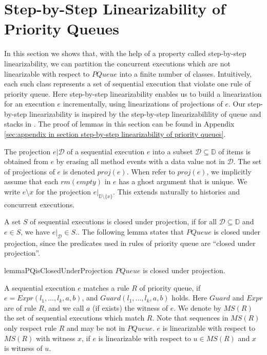\section{Step-by-Step Linearizability of Priority Queues}
\label{sec:step-by-step linearizability of priority queues}

In this section we shows that, with the help of a property called step-by-step linearizability, we can partition the concurrent executions which are not linearizable with respect to $\textit{PQueue}$ into a finite number of classes. Intuitively, each such class represents a set of sequential execution that violate one rule of priority queue. Here step-by-step linearizability enables us to build a linearization for an execution $e$ incrementally, using linearizations of projections of $e$. Our step-by-step linearizability is inspired by the step-by-step linearizabilility of queue and stacks in \cite{Bouajjani:2015}. The proof of lemmas in this section can be found in Appendix \ref{sec:appendix in section step-by-step linearizability of priority queues}.

The projection $e \vert{\mathcal{D}}$ of a sequential execution $e$ into a subset $\mathcal{D} \subseteq \mathbb{D}$ of items is obtained from $e$ by erasing all method events with a data value not in $\mathcal{D}$. The set of projections of $e$ is denoted $\textit{proj}(e)$. When refer to $\textit{proj}(e)$, we implicitly assume that each $\textit{rm}(\textit{empty})$ in $e$ has a ghost argument that is unique. We write $e \setminus x$ for the projection $e \vert_{ \mathbb{D} \setminus \{ x \} }$. This extends naturally to histories and concurrent executions.

A set $S$ of sequential executions is closed under projection, if for all $\mathcal{D} \subseteq \mathbb{D}$ and $e \in S$, we have $e \vert_{ \mathcal{D} } \in S$.. The following lemma states that $\textit{PQueue}$ is closed under projection, since the predicates used in rules of priority queue are ``closed under projection''.

\begin{restatable}{lemma}{PQisClosedUnderProjection}
\label{lemma:PQ is closed under projection}
$\textit{PQueue}$ is closed under projection.
\end{restatable}

A sequential execution $e$ matches a rule $R$ of priority queue, if $e=\textit{Expr}(l_1, \ldots, l_k,a,b)$, and $\textit{Guard}(l_1, \ldots, l_k,a,b)$ holds. Here $\textit{Guard}$ and $\textit{Expr}$ are of rule $R$, and we call $a$ (if exists) the witness of $e$. We denote by $\textit{MS}(R)$ the set of sequential executions which match $R$. Note that sequences in $\textit{MS}(R)$ only respect rule $R$ and may be not in $\textit{PQueue}$. $e$ is linearizable with respect to $\textit{MS}(R)$ with witness $x$, if $e$ is linearizable with respect to $u \in \textit{MS}(R)$ and $x$ is witness of $u$.

